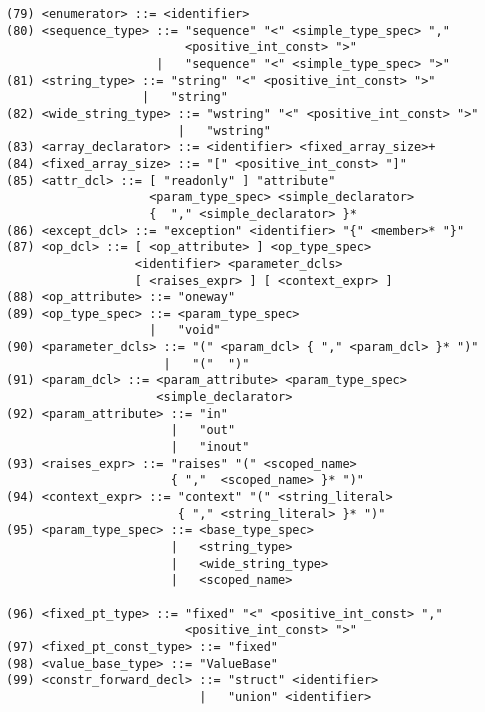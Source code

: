 \begin{verbatim}
(79) <enumerator> ::= <identifier> 
(80) <sequence_type> ::= "sequence" "<" <simple_type_spec> "," 
                         <positive_int_const> ">" 
                     |   "sequence" "<" <simple_type_spec> ">"
(81) <string_type> ::= "string" "<" <positive_int_const> ">"
                   |   "string"
(82) <wide_string_type> ::= "wstring" "<" <positive_int_const> ">"
                        |   "wstring"
(83) <array_declarator> ::= <identifier> <fixed_array_size>+ 
(84) <fixed_array_size> ::= "[" <positive_int_const> "]" 
(85) <attr_dcl> ::= [ "readonly" ] "attribute"  
                    <param_type_spec> <simple_declarator> 
                    {  "," <simple_declarator> }*
(86) <except_dcl> ::= "exception" <identifier> "{" <member>* "}" 
(87) <op_dcl> ::= [ <op_attribute> ] <op_type_spec> 
                  <identifier> <parameter_dcls>  
                  [ <raises_expr> ] [ <context_expr> ]
(88) <op_attribute> ::= "oneway" 
(89) <op_type_spec> ::= <param_type_spec>
                    |   "void"
(90) <parameter_dcls> ::= "(" <param_dcl> { "," <param_dcl> }* ")"
                      |   "("  ")"
(91) <param_dcl> ::= <param_attribute> <param_type_spec> 
                     <simple_declarator>
(92) <param_attribute> ::= "in"
                       |   "out" 
                       |   "inout"
(93) <raises_expr> ::= "raises" "(" <scoped_name>
                       { ","  <scoped_name> }* ")"
(94) <context_expr> ::= "context" "(" <string_literal> 
                        { "," <string_literal> }* ")"
(95) <param_type_spec> ::= <base_type_spec>
                       |   <string_type> 
                       |   <wide_string_type> 
                       |   <scoped_name>

(96) <fixed_pt_type> ::= "fixed" "<" <positive_int_const> "," 
                         <positive_int_const> ">"
(97) <fixed_pt_const_type> ::= "fixed" 
(98) <value_base_type> ::= "ValueBase" 
(99) <constr_forward_decl> ::= "struct" <identifier>
                           |   "union" <identifier>
\end{verbatim}
